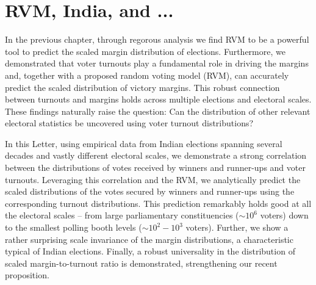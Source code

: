 \chapter{RVM, India, and ...}
\label{chap6}

In the previous chapter, through regorous analysis we find RVM to be a powerful tool to predict the scaled margin distribution of elections. Furthermore, we demonstrated that voter turnouts play a fundamental role in driving the margins and, together with a proposed random voting model (RVM), can accurately predict the scaled distribution of victory margins. This robust connection between turnouts and margins holds across multiple elections and electoral scales. These findings naturally raise the question: Can the distribution of other relevant electoral statistics be uncovered using voter turnout distributions?

In this Letter, using empirical data from Indian elections \cite{india_data, lokdhaba} spanning several decades and vastly different electoral scales, we demonstrate a strong correlation between the distributions of votes received by winners and runner-ups and voter turnouts. Leveraging this correlation and the RVM, we analytically predict the scaled distributions of the votes secured by winners and runner-ups using the corresponding turnout distributions. This prediction remarkably holds good at all the electoral scales -- from large parliamentary constituencies ($ \sim 10^6$ voters) down to the smallest polling booth levels ($\sim 10^2-10^3$ voters). Further, we show a rather surprising scale invariance of the margin distributions, a characteristic typical of Indian elections. Finally, a robust universality in the distribution of scaled margin-to-turnout ratio is demonstrated, strengthening our recent proposition.

